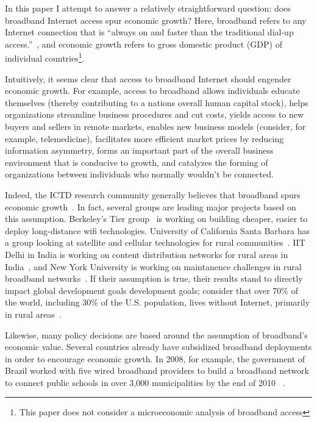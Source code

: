 In this paper I attempt to answer a relatively straightforward question: does
broadband Internet access spur economic growth? Here, broadband refers to any
Internet connection that is ``always on and faster than the traditional dial-up
access.''~\cite{fcc_bband}, and economic growth refers to gross domestic
product (GDP) of individual countries\footnote{This paper does not consider
a microeconomic analysis of broadband access}.

Intuitively, it seems clear that access to broadband Internet should engender
economic growth. For example, access to
broadband allows individuals educate themselves (thereby contributing to a
nations overall human capital stock), helps organizations streamline business
procedures and cut costs, yields access to new buyers and sellers in remote markets,
enables new business models (consider, for example, telemedicine),
facilitates more efficient market prices by reducing
information asymmetry, forms an important part of the overall business environment
that is conducive to growth, and catalyzes the forming of
organizations between individuals who normally wouldn’t be connected.

Indeed, the ICTD research community generally believes that broadband
spurs economic growth~\cite{brewer2005case}. In fact, several groups are leading major
projects based on this assumption. Berkeley's Tier group~\cite{tier} is working on
building cheaper, easier to deploy long-distance wifi technologies. University of California Santa Barbara has a
group looking at satellite and cellular technologies for rural communities~\cite{ucsb}.
IIT Delhi in India is working on content distribution networks for rural areas
in India~\cite{mahla2012motivation}, and New York University is working on
maintanence challenges in rural broadband networks~\cite{surana2008beyond}.
If their assumption is true, their results stand to directly impact global
development goals development goals; consider that over 70\% of the world, including
30\% of the U.S. population, lives without Internet, primarily in rural areas~\cite{rural_stats}.

Likewise, many policy decisions are based around the assumption of broadband's
economic value. Several countries already have subsidized broadband deployments
in order to encourage economic growth. In 2008, for example, the government of Brazil worked with
five wired broadband providers to build a broadband network to connect public
schools in over 3,000 municipalities by the end of 2010 ~\cite{gazeta}.

